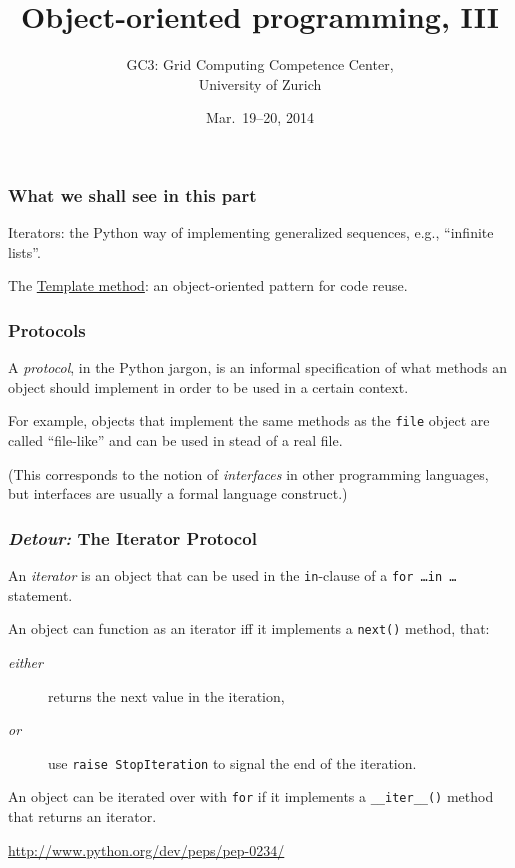 \documentclass[english,serif,mathserif,xcolor=pdftex,dvipsnames,table]{beamer}
\title[OOP 2]{%
  Object-oriented programming, III
}
\author[GC3]{%
  GC3: Grid Computing Competence Center, \\
  University of Zurich
}
\date{Mar.~19--20, 2014}
\begin{document}
\maketitle


\begin{frame}
  \frametitle{What we shall see in this part}

  Iterators: the Python way of implementing generalized sequences,
  e.g., ``infinite lists''.

  \+
  The \href{http://en.wikipedia.org/wiki/Template_method_pattern}{Template
    method}: an object-oriented pattern for code reuse.
\end{frame}


\begin{frame}
  \frametitle{Protocols}
  A \emph{protocol}, in the Python jargon, is an informal
  specification of what methods an object should implement in order to
  be used in a certain context.

  \+ For example, objects that implement the same methods as the
  \texttt{file} object are called ``file-like'' and can be used in
  stead of a real file.

  \+
  (This corresponds to the notion of \emph{interfaces} in other
  programming languages, but interfaces are usually a formal language
  construct.)
\end{frame}


\begin{frame}[fragile]
  \frametitle{\emph{Detour:} The Iterator Protocol}

  An \emph{iterator} is an object that can be used in the
  \texttt{in}-clause of a \texttt{for \ldots in \ldots} statement.

  \+
  An object can function as an iterator iff it implements a
  \texttt{next()} method, that:
  \begin{description}
  \item[\emph{either}] returns the next value in the iteration,
  \item[\emph{or}] use \lstinline|raise StopIteration| to signal the
    end of the iteration.
  \end{description}

  \+
  An object can be iterated over with \lstinline|for| if it implements a
  \lstinline|__iter__()| method that returns an iterator.

  \begin{references}
    \url{http://www.python.org/dev/peps/pep-0234/}
  \end{references}
\end{frame}
\end{document}
